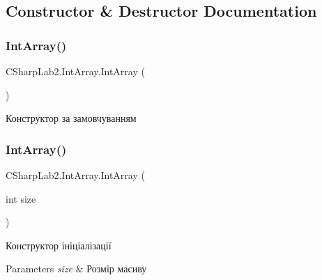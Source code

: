 \subsection{Constructor \& Destructor Documentation}
\hypertarget{class_c_sharp_lab2_1_1_int_array_a3fe8a5d200583c1c345b4af4e14024be}{}\label{class_c_sharp_lab2_1_1_int_array_a3fe8a5d200583c1c345b4af4e14024be} 
\subsubsection{\texorpdfstring{Int\+Array()}{IntArray()}\hspace{0.1cm}{\footnotesize\ttfamily [1/2]}}
{\footnotesize\ttfamily C\+Sharp\+Lab2.\+Int\+Array.\+Int\+Array (\begin{DoxyParamCaption}{ }\end{DoxyParamCaption})\hspace{0.3cm}{\ttfamily [inline]}}



Конструктор за замовчуванням 

\hypertarget{class_c_sharp_lab2_1_1_int_array_acc7eb5c0179289e1d64e791ee0ee5cce}{}\label{class_c_sharp_lab2_1_1_int_array_acc7eb5c0179289e1d64e791ee0ee5cce} 
\subsubsection{\texorpdfstring{Int\+Array()}{IntArray()}\hspace{0.1cm}{\footnotesize\ttfamily [2/2]}}
{\footnotesize\ttfamily C\+Sharp\+Lab2.\+Int\+Array.\+Int\+Array (\begin{DoxyParamCaption}\item[{int}]{size }\end{DoxyParamCaption})\hspace{0.3cm}{\ttfamily [inline]}}



Конструктор ініціалізації 


\begin{DoxyParams}{Parameters}
{\em size} & Розмір масиву\\
\hline
\end{DoxyParams}


